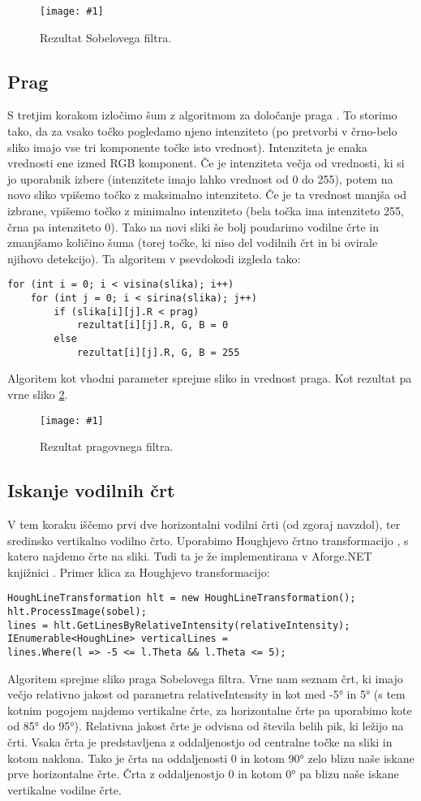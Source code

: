 \documentclass[oneside, a4paper, 12pt]{book}
\newcommand{\slika}[3]{
	\begin{figure}
	\begin{center}
	\texttt{[image: \#1]}
	\end{center}
	\vspace{-20pt}
	\caption{#2}
	\label{#3}
	\end{figure}
}
\begin{document}
\slika{slike/sobel.jpg}{Rezultat Sobelovega filtra.}{pic:sobel}

\subsection{Prag}
S tretjim korakom izločimo šum z algoritmom za določanje praga \cite{treshold-wiki}. To storimo tako, da za vsako točko pogledamo njeno intenziteto (po pretvorbi v črno-belo sliko imajo vse tri komponente točke isto vrednost). Intenziteta je enaka vrednosti ene izmed RGB komponent. Če je intenziteta večja od vrednosti, ki si jo uporabnik izbere (intenzitete imajo lahko vrednost od 0 do 255), potem na novo sliko vpišemo točko z maksimalno intenziteto. Če je ta vrednost manjša od izbrane, vpišemo točko z minimalno intenziteto (bela točka ima intenziteto 255, črna pa intenziteto 0). Tako na novi sliki še bolj poudarimo vodilne črte in zmanjšamo količino šuma (torej točke, ki niso del vodilnih črt in bi ovirale njihovo detekcijo). Ta algoritem v psevdokodi izgleda tako:
\begin{samepage}
\begin{verbatim}
for (int i = 0; i < visina(slika); i++)
    for (int j = 0; i < sirina(slika); j++)
        if (slika[i][j].R < prag)
            rezultat[i][j].R, G, B = 0
        else
            rezultat[i][j].R, G, B = 255
\end{verbatim}
\end{samepage}
Algoritem kot vhodni parameter sprejme sliko in vrednost praga. Kot rezultat pa vrne sliko \ref{pic:treshold}.

\slika{slike/treshold.jpg}{Rezultat pragovnega filtra.}{pic:treshold}


\subsection{Iskanje vodilnih črt}
V tem koraku iščemo prvi dve horizontalni vodilni črti (od zgoraj navzdol), ter sredinsko vertikalno vodilno črto. Uporabimo Houghjevo črtno transformacijo \cite{hough-wiki}, s katero najdemo črte na sliki. Tudi ta je že implementirana v Aforge.NET knjižnici \cite{hough}. Primer klica za Houghjevo transformacijo:
\begin{samepage}
\begin{verbatim}
HoughLineTransformation hlt = new HoughLineTransformation();
hlt.ProcessImage(sobel);
lines = hlt.GetLinesByRelativeIntensity(relativeIntensity);
IEnumerable<HoughLine> verticalLines = 
lines.Where(l => -5 <= l.Theta && l.Theta <= 5);
\end{verbatim}
\end{samepage}
Algoritem sprejme sliko praga Sobelovega filtra. Vrne nam seznam črt, ki imajo večjo relativno jakost od parametra relativeIntensity in kot med -5° in 5° (s tem kotnim pogojem najdemo vertikalne črte, za horizontalne črte pa uporabimo kote od 85° do 95°). Relativna jakost črte je odvisna od števila belih pik, ki ležijo na črti. Vsaka črta je predstavljena z oddaljenostjo od centralne točke na sliki in kotom naklona. Tako je črta na oddaljenosti 0 in kotom 90° zelo blizu naše iskane prve horizontalne črte. Črta z oddaljenostjo 0 in kotom 0° pa blizu naše iskane vertikalne vodilne črte. \cite{hough} 
\end{document}
